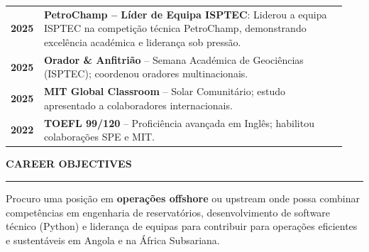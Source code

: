 \documentclass[10pt,a4paper]{article}
\renewcommand{\textbf}[1]{{\bfseries\color{cvgold}#1}}
\newcommand{\mainSection}[1]{%
  \vspace{1pt}%
  {\bfseries\color{cvgold}\large\MakeUppercase{#1}}%
  \par\vspace{0pt}%
  {\color{cvgold}\rule{\linewidth}{0.9pt}}%
  \par\vspace{1pt}%
}
\begin{document}
\begin{minipage}[t]{\dimexpr 0.705\paperwidth - 26pt}
  \renewcommand{\arraystretch}{1.40}
  \begin{tabular}{@{} p{0.06\linewidth} p{0.88\linewidth} @{}}
    {\bfseries\color{cvgold}2025} &
      \textbf{PetroChamp -- Líder de Equipa ISPTEC}: Liderou a equipa ISPTEC na competição técnica PetroChamp, demonstrando excelência académica e liderança sob pressão.\\
    {\bfseries\color{cvgold}2025} &
      \textbf{Orador \& Anfitrião} -- Semana Académica de Geociências (ISPTEC); coordenou oradores multinacionais.\\
    {\bfseries\color{cvgold}2025} &
      \textbf{MIT Global Classroom} -- Solar Comunitário; estudo apresentado a colaboradores internacionais.\\
    {\bfseries\color{cvgold}2022} &
      \textbf{TOEFL 99/120} -- Proficiência avançada em Inglês; habilitou colaborações SPE e MIT.\\
  \end{tabular}
  \renewcommand{\arraystretch}{1}

  \mainSection{Career Objectives}
  Procuro uma posição em \textbf{operações offshore} ou upstream onde possa combinar
  competências em engenharia de reservatórios, desenvolvimento de software técnico
  (Python) e liderança de equipas para contribuir para operações eficientes e
  sustentáveis em Angola e na África Subsariana.

  \vspace{2pt}

\end{minipage}
\end{document}
